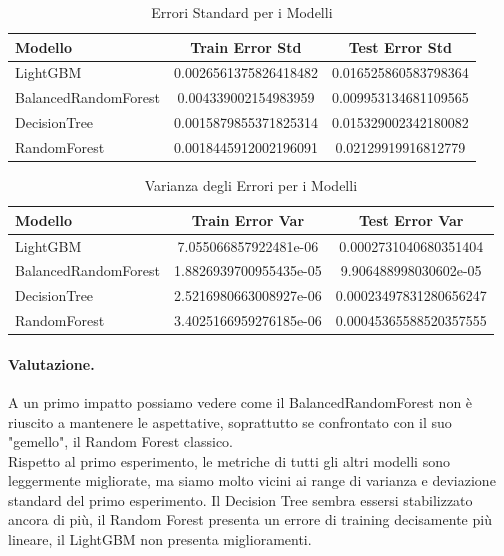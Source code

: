 \begin{table}[H]
    \centering
    \begin{tabular}{lcc}
    \toprule
    \textbf{Modello} & \textbf{Train Error Std} & \textbf{Test Error Std} \\
    \midrule
    LightGBM & 0.0026561375826418482 & 0.016525860583798364 \\
    BalancedRandomForest & 0.004339002154983959 & 0.009953134681109565\\
    DecisionTree & 0.0015879855371825314 & 0.015329002342180082 \\
    RandomForest & 0.0018445912002196091 & 0.02129919916812779 \\
    \bottomrule
    \end{tabular}
    \caption{Errori Standard per i Modelli}
\end{table}


\begin{table}[H]
    \centering
    \begin{tabular}{lcc}
    \toprule
    \textbf{Modello} & \textbf{Train Error Var} & \textbf{Test Error Var} \\
    \midrule
    LightGBM & 7.055066857922481e-06 & 0.0002731040680351404 \\
    BalancedRandomForest & 1.8826939700955435e-05 & 9.906488998030602e-05 \\
    DecisionTree & 2.5216980663008927e-06 & 0.00023497831280656247 \\
    RandomForest & 3.4025166959276185e-06 & 0.00045365588520357555 \\
    \bottomrule
    \end{tabular}
    \caption{Varianza degli Errori per i Modelli}
\end{table}

\paragraph{Valutazione.} A un primo impatto possiamo vedere come il BalancedRandomForest non è riuscito a mantenere le aspettative, soprattutto se confrontato con il suo "gemello", il Random Forest classico. \\ Rispetto al primo esperimento, le metriche di tutti gli altri modelli sono leggermente migliorate, ma siamo molto vicini ai range di varianza e deviazione standard del primo esperimento. Il Decision Tree sembra essersi stabilizzato ancora di più, il Random Forest presenta un errore di training decisamente più lineare, il LightGBM non presenta miglioramenti.

